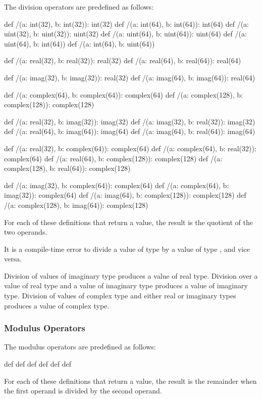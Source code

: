 The division operators are predefined as follows:
\begin{chapel}
def /(a: int(32), b: int(32)): int(32)
def /(a: int(64), b: int(64)): int(64)
def /(a: uint(32), b: uint(32)): uint(32)
def /(a: uint(64), b: uint(64)): uint(64)
def /(a: uint(64), b: int(64))
def /(a: int(64), b: uint(64))

def /(a: real(32), b: real(32)): real(32)
def /(a: real(64), b: real(64)): real(64)

def /(a: imag(32), b: imag(32)): real(32)
def /(a: imag(64), b: imag(64)): real(64)

def /(a: complex(64), b: complex(64)): complex(64)
def /(a: complex(128), b: complex(128)): complex(128)

def /(a: real(32), b: imag(32)): imag(32)
def /(a: imag(32), b: real(32)): imag(32)
def /(a: real(64), b: imag(64)): imag(64)
def /(a: imag(64), b: real(64)): imag(64)

def /(a: real(32), b: complex(64)): complex(64)
def /(a: complex(64), b: real(32)): complex(64)
def /(a: real(64), b: complex(128)): complex(128)
def /(a: complex(128), b: real(64)): complex(128)

def /(a: imag(32), b: complex(64)): complex(64)
def /(a: complex(64), b: imag(32)): complex(64)
def /(a: imag(64), b: complex(128)): complex(128)
def /(a: complex(128), b: imag(64)): complex(128)
\end{chapel}
For each of these definitions that return a value, the result is the
quotient of the two operands.

It is a compile-time error to divide a value of type  by
a value of type , and vice versa.

Division of values of imaginary type produces a value of real type.
Division over a value of real type and a value of imaginary type
produces a value of imaginary type.  Division of values of complex
type and either real or imaginary types produces a value of complex
type.

\subsubsection{Modulus Operators}
\label{Modulus_Operators}

The modulus operators are predefined as follows:
\begin{chapel}
def %
def %
def %
def %
def %
def %
\end{chapel}
For each of these definitions that return a value, the result is the
remainder when the first operand is divided by the second operand.

